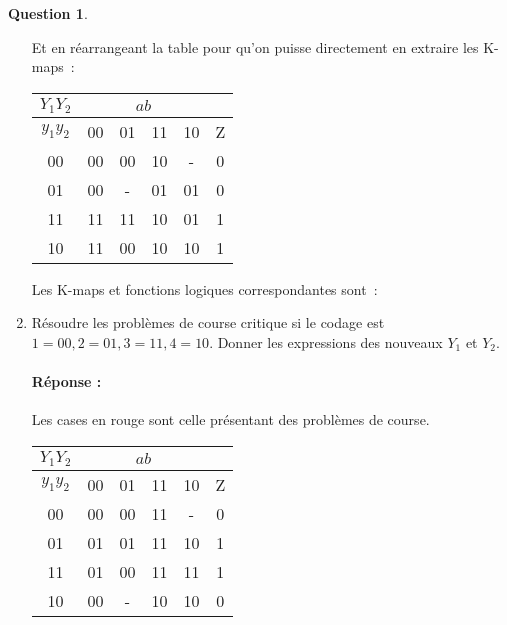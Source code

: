 \documentclass[11pt,a4paper]{article}
\theoremstyle{definition}%
\newtheorem{Q}{Question}[] %
\newcommand{\reponse}[1]{%
	\ifthenelse {\boolean{corrige}} {\paragraph{Réponse :} \color{darkblue}   #1\color{black}} {}
 }
\begin{document}
\begin{Q}
\begin{enumerate}
{		Et en réarrangeant la table pour qu'on puisse directement en extraire les K-maps~:
		\begin{center}
			\begin{tabular}{|c|c|c|c|c|c|}\hline
			$Y_1Y_2$ & \multicolumn{4}{c|}{$ab$} & \\ \hline
			$y_1y_2$ & 00 & 01 & 11 & 10 & Z \\ \hline
			00       & 00 & 00 & 10 & -  & 0 \\ \hline
			01       & 00 & -  & 01 & 01 & 0 \\ \hline
			11       & 11 & 11 & 10 & 01 & 1 \\ \hline
			10       & 11 & 00 & 10 & 10 & 1 \\ \hline
			\end{tabular}
		\end{center}

		Les K-maps et fonctions logiques correspondantes sont~:

		\begin{center}
		\end{center}

		\begin{center}
		\end{center}

		\begin{center}
		\end{center}
	}
	\item Résoudre les problèmes de course critique si le codage est $1=00, 2=01, 3=11, 4=10$.
	Donner les expressions des nouveaux $Y_1$ et $Y_2$.
	\reponse{
		Les cases en {\color{red}rouge} sont celle présentant des problèmes de course.

		\begin{center}
			\begin{tabular}{|c|c|c|c|c|c|}\hline
			$Y_1Y_2$ & \multicolumn{4}{c|}{$ab$} & \\ \hline
			$y_1y_2$ & 00 & 01 & 11 & 10 & Z \\ \hline
			00       & 00 & 00 & {\color{red}11} & -  & 0 \\ \hline
			01       & 01 & 01 & 11 & {\color{red}10} & 1 \\ \hline
			11       & 01 & {\color{red}00} & 11 & 11 & 1 \\ \hline
			10       & 00 & -  & 10 & 10 & 0 \\ \hline
			\end{tabular}
		\end{center}
		
}
\end{enumerate}
\end{Q}
\end{document}
